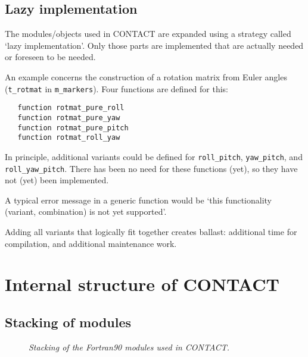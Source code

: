 \documentclass[12pt]{report}
\begin{document}
\section{Lazy implementation}
\label{sec:lazy_implem}

The modules/objects used in CONTACT are expanded using a strategy called
`lazy implementation'. Only those parts are implemented that are actually
needed or foreseen to be needed.

An example concerns the construction of a rotation matrix from Euler angles
({\tt t\_rotmat} in {\tt m\_\-mar\-kers}). Four functions are defined for this:
{\small\begin{verbatim}
   function rotmat_pure_roll
   function rotmat_pure_yaw
   function rotmat_pure_pitch
   function rotmat_roll_yaw
\end{verbatim}}
In principle, additional variants could be defined for {\tt roll\_pitch}, 
{\tt yaw\_pitch}, and {\tt roll\_\-yaw\_\-pitch}. There has been no need for
these functions (yet), so they have not (yet) been implemented.

A typical error message in a generic function would be `this functionality
(variant, combination) is not yet supported'.

Adding all variants that logically fit together creates ballast: additional
time for compilation, and additional maintenance work.

\chapter{Internal structure of CONTACT}

\section{Stacking of modules}

\begin{figure}[p]
\centering
{}
\caption{\em Stacking of the Fortran90 modules used in CONTACT.}
\label{fig:arch_modules2}
\end{figure}
\end{document}
